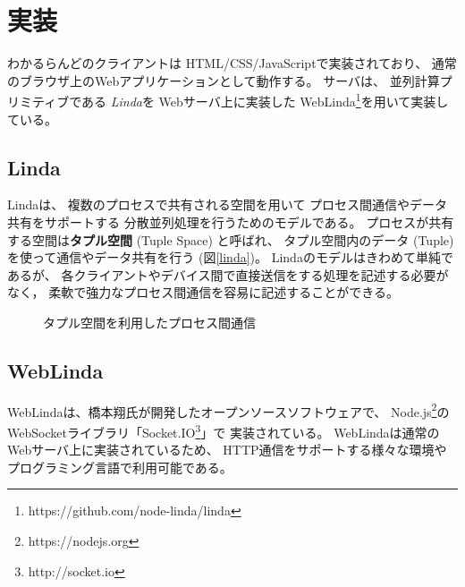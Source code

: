 \section{実装}

わかるらんどのクライアントは
HTML/CSS/JavaScriptで実装されており、
通常のブラウザ上のWebアプリケーションとして動作する。
%
サーバは、
並列計算プリミティブである
\textit{Linda}\cite{Carriero:1989:LC:63334.63337}を
Webサーバ上に実装した
WebLinda\footnote{https://github.com/node-linda/linda}を用いて実装している。

\subsection{Linda}

Lindaは、
複数のプロセスで共有される空間を用いて
プロセス間通信やデータ共有をサポートする
分散並列処理を行うためのモデルである。
プロセスが共有する空間は\textbf{タプル空間} (Tuple Space) と呼ばれ、
タプル空間内のデータ (Tuple) を使って通信やデータ共有を行う (図\ref{linda})。
Lindaのモデルはきわめて単純であるが、
各クライアントやデバイス間で直接送信をする処理を記述する必要がなく，
柔軟で強力なプロセス間通信を容易に記述することができる。

\begin{figure}[h]
\centering
{}
\caption{タプル空間を利用したプロセス間通信}
\label{button}
\end{figure}

\subsection{WebLinda}

WebLindaは、橋本翔氏が開発したオープンソースソフトウェアで、
Node.js\footnote{https://nodejs.org}の
WebSocketライブラリ「Socket.IO\footnote{http://socket.io}」で
実装されている。
WebLindaは通常のWebサーバ上に実装されているため、
HTTP通信をサポートする様々な環境やプログラミング言語で利用可能である。

